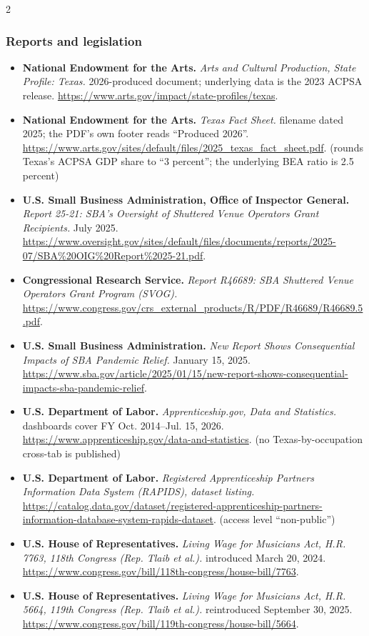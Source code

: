 {\begin{multicols}{2}
\subsubsection*{Reports and legislation}
\begin{itemize}[itemsep=0pt,topsep=1pt,parsep=0pt,partopsep=0pt,leftmargin=1em]
\item \textbf{National Endowment for the Arts.} \textit{Arts and Cultural Production, State Profile: Texas.} 2026-produced document; underlying data is the 2023 ACPSA release. \url{https://www.arts.gov/impact/state-profiles/texas}.
\item \textbf{National Endowment for the Arts.} \textit{Texas Fact Sheet.} filename dated 2025; the PDF’s own footer reads “Produced 2026”. \url{https://www.arts.gov/sites/default/files/2025_texas_fact_sheet.pdf}. {\color{ammuted}(rounds Texas’s ACPSA GDP share to “3 percent”; the underlying BEA ratio is 2.5 percent)}
\item \textbf{U.S. Small Business Administration, Office of Inspector General.} \textit{Report 25-21: SBA’s Oversight of Shuttered Venue Operators Grant Recipients.} July 2025. \url{https://www.oversight.gov/sites/default/files/documents/reports/2025-07/SBA%20OIG%20Report%2025-21.pdf}.
\item \textbf{Congressional Research Service.} \textit{Report R46689: SBA Shuttered Venue Operators Grant Program (SVOG).} \url{https://www.congress.gov/crs_external_products/R/PDF/R46689/R46689.5.pdf}.
\item \textbf{U.S. Small Business Administration.} \textit{New Report Shows Consequential Impacts of SBA Pandemic Relief.} January 15, 2025. \url{https://www.sba.gov/article/2025/01/15/new-report-shows-consequential-impacts-sba-pandemic-relief}.
\item \textbf{U.S. Department of Labor.} \textit{Apprenticeship.gov, Data and Statistics.} dashboards cover FY Oct. 2014--Jul. 15, 2026. \url{https://www.apprenticeship.gov/data-and-statistics}. {\color{ammuted}(no Texas-by-occupation cross-tab is published)}
\item \textbf{U.S. Department of Labor.} \textit{Registered Apprenticeship Partners Information Data System (RAPIDS), dataset listing.} \url{https://catalog.data.gov/dataset/registered-apprenticeship-partners-information-database-system-rapids-dataset}. {\color{ammuted}(access level “non-public”)}
\item \textbf{U.S. House of Representatives.} \textit{Living Wage for Musicians Act, H.R. 7763, 118th Congress (Rep. Tlaib et al.).} introduced March 20, 2024. \url{https://www.congress.gov/bill/118th-congress/house-bill/7763}.
\item \textbf{U.S. House of Representatives.} \textit{Living Wage for Musicians Act, H.R. 5664, 119th Congress (Rep. Tlaib et al.).} reintroduced September 30, 2025. \url{https://www.congress.gov/bill/119th-congress/house-bill/5664}.
\end{itemize}
\end{multicols}
}


